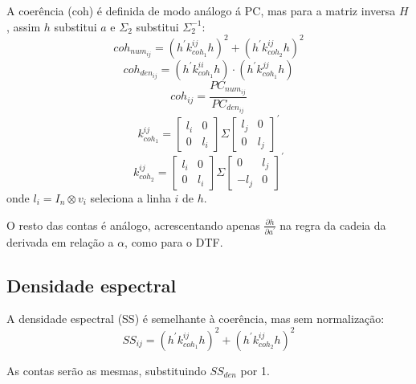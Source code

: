 \documentclass[a4paper,10pt]{article}
\begin{document}
A coerência (coh) é definida de modo análogo á PC, mas para a matriz inversa $H$, assim $h$ substitui $a$ e $\Sigma_{2}$ substitui $\Sigma_{2}^{-1}$:
\begin{equation}
coh_{num_{ij}} = \left( h^{'} k_{coh_{1}}^{ij} h \right)^{2} + \left( h^{'} k_{coh_{2}}^{ij} h \right)^{2}
\end{equation}
\begin{equation}
coh_{den_{ij}} = \left( h^{'} k_{coh_{1}}^{ii} h \right) \cdot \left( h^{'} k_{coh_{1}}^{jj} h \right)
\end{equation}
\begin{equation}
coh_{ij} = \frac{PC_{num_{ij}}}{PC_{den_{ij}}}
\end{equation}
\begin{equation}
k_{coh_{1}}^{ij} = \left[ \begin{array}{cc}
 l_{i} & 0 \\ 0 & l_{i}
\end{array} \right] \Sigma \left[ \begin{array}{cc}
 l_{j} & 0 \\ 0 & l_{j}
\end{array} \right]^{'}
\end{equation}
\begin{equation}
k_{coh_{2}}^{ij} = \left[ \begin{array}{cc}
 l_{i} & 0 \\ 0 & l_{i}
\end{array} \right] \Sigma \left[ \begin{array}{cc}
 0 & l_{j} \\ -l_{j} & 0
\end{array} \right]^{'}
\end{equation}
onde $l_{i} = I_{n} \otimes v_{i}$ seleciona a linha $i$ de $h$.

O resto das contas é análogo, acrescentando apenas $\frac{\partial h}{\partial a^{'}}$ na regra da cadeia da derivada em relação a $\alpha$, como para o DTF.


\subsection{Densidade espectral}

A densidade espectral (SS) é semelhante à coerência, mas sem normalização:
\begin{equation}
SS_{ij} = \left( h^{'} k_{coh_{1}}^{ij} h \right)^{2} + \left( h^{'} k_{coh_2}^{ij} h \right)^{2}
\end{equation}

As contas serão as mesmas, substituindo $SS_{den}$ por 1.
\end{document}
